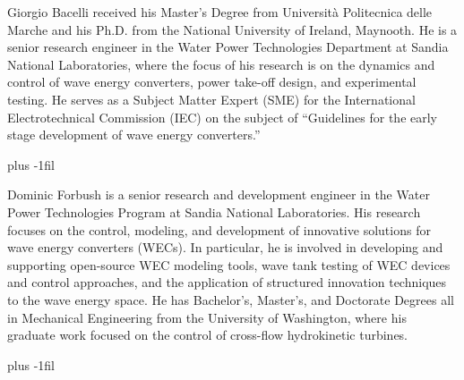 \documentclass[lettersize,journal]{IEEEtran}
\begin{document}
\begin{IEEEbiography}{Giorgio Bacelli} 
received his Master's Degree from Università Politecnica delle Marche and his Ph.D. from the National University of Ireland, Maynooth. 
He is a senior research engineer in the Water Power Technologies Department at Sandia National Laboratories, where the focus of his research is on the dynamics and control of wave energy converters, power take-off design, and experimental testing.
He serves as a Subject Matter Expert (SME) for the International Electrotechnical Commission (IEC) on the subject of ``Guidelines for the early stage development of wave energy converters.''
\end{IEEEbiography}

\vskip 0pt plus -1fil

\begin{IEEEbiography}{Dominic Forbush}
is a senior research and development engineer in the Water Power Technologies Program at Sandia National Laboratories.
His research focuses on the control, modeling, and development of innovative solutions for wave energy converters (WECs).
In particular, he is involved in developing and supporting open-source WEC modeling tools, wave tank testing of WEC devices and control approaches, and the application of structured innovation techniques to the wave energy space.
He has Bachelor's, Master's, and Doctorate Degrees all in Mechanical Engineering from the University of Washington, where his graduate work focused on the control of cross-flow hydrokinetic turbines.
\end{IEEEbiography}

\vskip 0pt plus -1fil
\end{document}
